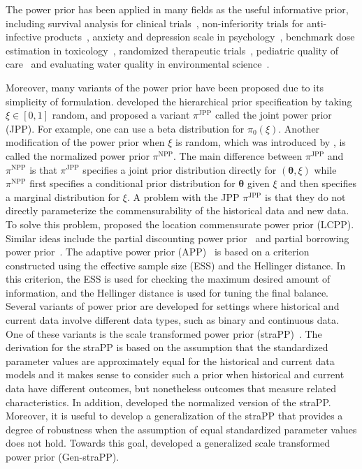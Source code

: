 \documentclass[12pt]{article}
\begin{document}
The power prior has been applied in many fields as the useful informative prior, including survival analysis for clinical trials~\citep{chen1999new,chen2002bayesian,ibrahim2012bayesian}, non-inferiority trials for anti-infective products~\citep{gamalo2014bayesian}, anxiety and depression scale in psychology~\citep{matteucci2014bayesian}, benchmark dose estimation in toxicology~\citep{shao2011bayesian}, randomized therapeutic trials~\citep{rietbergen2011incorporation}, pediatric quality of care~\citep{neelon2010bayesian} and evaluating water quality in environmental science~\citep{duan2006evaluating}.

Moreover, many variants of the power prior have been proposed due to its simplicity of formulation.
\citet{chen2000power} developed the hierarchical prior specification by taking $\xi \in [0, 1]$ random, and proposed a variant $\pi^{\mathrm{JPP}}$ called the joint power prior (JPP).
For example, one can use a beta distribution for $\pi_0(\xi)$.
Another modification of the power prior when $\xi$ is random, which was introduced by \citet{duan2006evaluating}, is called the normalized power prior $\pi^{\mathrm{NPP}}$.
The main difference between $\pi^{\mathrm{JPP}}$ and $\pi^{\mathrm{NPP}}$ is that $\pi^{\mathrm{JPP}}$ specifies a joint prior distribution directly for $(\bm{\theta}, \xi)$ while $\pi^{\mathrm{NPP}}$ first specifies a conditional prior distribution for $\bm{\theta}$ given $\xi$ and then specifies a marginal distribution for $\xi$.
A problem with the JPP $\pi^{\mathrm{JPP}}$ is that they do not directly parameterize the commensurability of the historical data and new data.
To solve this problem, \citet{hobbs2011hierarchical} proposed the location commensurate power prior (LCPP).
Similar ideas include the partial discounting power prior~\citep{chen2001bayesian} and partial borrowing power prior~\citep{ibrahim2012bayesian}.
The adaptive power prior (APP)~\citep{ollier2020adaptive} is based on a criterion constructed using the effective sample size (ESS) and the Hellinger distance.
In this criterion, the ESS is used for checking the maximum desired amount of information, and the Hellinger distance is used for tuning the final balance.
Several variants of power prior are developed for settings where historical and current data involve different data types, such as binary and continuous data.
One of these variants is the scale transformed power prior (straPP)~\citep{alt2023scale}.
The derivation for the straPP is based on the assumption that the standardized parameter values are approximately equal for the historical and current data models and it makes sense to consider such a prior when historical and current data have different outcomes, but nonetheless outcomes that measure related characteristics.
In addition, \citet{alt2023scale} developed the normalized version of the straPP.
Moreover, it is useful to develop a generalization of the straPP that provides a degree of robustness when the assumption of equal standardized parameter values does not hold.
Towards this goal, \citet{alt2023scale} developed a generalized scale transformed power prior (Gen-straPP).
\end{document}
